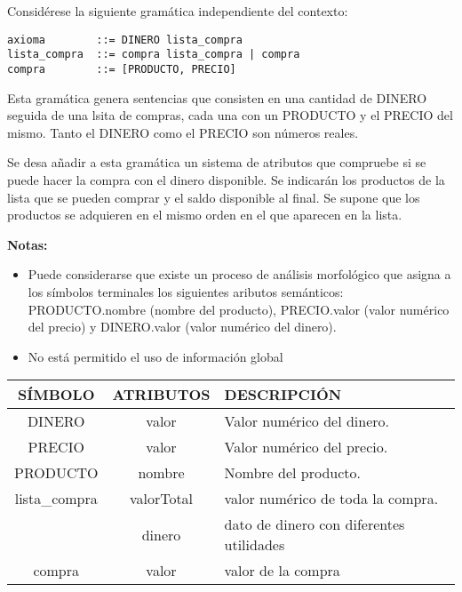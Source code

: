 \begin{problem}[4]
Considérese la siguiente gramática independiente del contexto:
\begin{verbatim}
axioma        ::= DINERO lista_compra
lista_compra  ::= compra lista_compra | compra
compra        ::= [PRODUCTO, PRECIO]
\end{verbatim}
Esta gramática genera sentencias que consisten en una cantidad de DINERO seguida de una lsita de compras, cada una con un PRODUCTO y el PRECIO del mismo. Tanto el DINERO como el PRECIO son números reales.

Se desa añadir a esta gramática un sistema de atributos que compruebe si se puede hacer la compra con el dinero disponible. Se indicarán los productos de la lista que se pueden comprar y el saldo disponible al final. Se supone que los productos se adquieren en el mismo orden en el que aparecen en la lista.

\textbf{Notas:}
\begin{itemize}
\item Puede considerarse que existe un proceso de análisis morfológico que asigna a los símbolos terminales los siguientes aributos semánticos: PRODUCTO.nombre (nombre del producto), PRECIO.valor (valor numérico del precio) y DINERO.valor (valor numérico del dinero).
\item No está permitido el uso de información global
\end{itemize}
\solution

\begin{tabular}{|c|c|l|}
\hline
SÍMBOLO & ATRIBUTOS & DESCRIPCIÓN \\
\hline
\hline
DINERO & valor & Valor numérico del dinero. \\
\hline
PRECIO & valor & Valor numérico del precio. \\
\hline
PRODUCTO & nombre & Nombre del producto. \\
\hline
 lista\_compra & valorTotal & valor numérico de toda la compra. \\
 \cline{2-3}
  & dinero & dato de dinero con diferentes utilidades  \\
\hline
compra & valor & valor de la compra \\

\hline
\end{tabular}


\end{problem}
